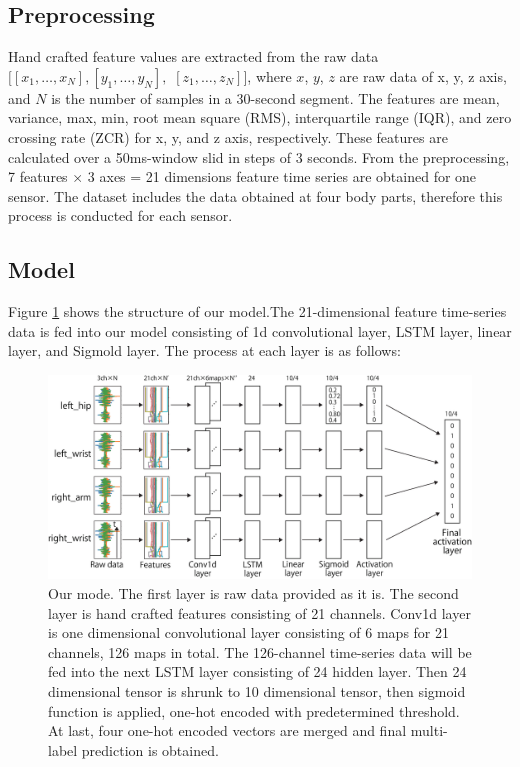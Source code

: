 \documentclass{svmult}
\begin{document}
\subsection{Preprocessing}
Hand crafted feature values are extracted from the raw data $[[x_1,\dots, x_N], [y_1, \dots, y_N],$ $[z_1, \dots, z_N]]$, where $x$, $y$, $z$ are raw data of x, y, z axis, and $N$ is the number of samples in a 30-second segment. The features are mean, variance, max, min, root mean square (RMS), interquartile range (IQR), and zero crossing rate (ZCR) for x, y, and z axis, respectively. These features are calculated over a 50ms-window slid in steps of 3 seconds. From the preprocessing, 7 features $\times$ 3 axes = 21 dimensions feature time series are obtained for one sensor. The dataset includes the data obtained at four body parts, therefore this process is conducted for each sensor.

\subsection{Model}
Figure \ref{fig:model} shows the structure of our model.The 21-dimensional feature time-series data is fed into our model consisting of 1d convolutional layer, LSTM layer, linear layer, and Sigmold layer. The process at each layer is as follows:

\begin{figure}[h]
\sidecaption[t]
\includegraphics[width=1\linewidth]{Figure_1}
\caption{Our mode. The first layer is raw data provided as it is. The second layer is hand crafted features consisting of 21 channels. Conv1d layer is one dimensional convolutional layer consisting of 6 maps for 21 channels, 126 maps in total. The 126-channel time-series data will be fed into the next LSTM layer consisting of 24 hidden layer. Then 24 dimensional tensor is shrunk to 10 dimensional tensor, then sigmoid function is applied, one-hot encoded with predetermined threshold. At last, four one-hot encoded vectors are merged and final multi-label prediction is obtained.}
\label{fig:model}
\end{figure}
\end{document}
